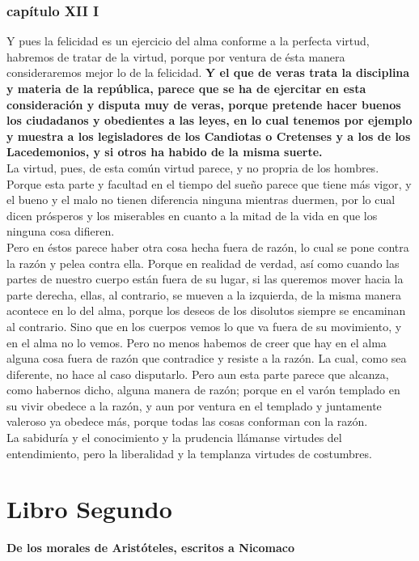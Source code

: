 \begin{multicols}{2}
\section*{capítulo XII I}
Y pues la felicidad es un ejercicio del alma conforme a la perfecta virtud, habremos de tratar de la virtud, porque por ventura de ésta manera consideraremos mejor lo de la felicidad. \textbf{Y el que de veras trata la disciplina y materia de la república, parece que se ha de ejercitar en esta consideración y disputa muy de veras, porque pretende hacer buenos los ciudadanos y obedientes a las leyes, en lo cual tenemos por ejemplo y muestra a los legisladores de los Candiotas o Cretenses y a los de los Lacedemonios, y si otros ha habido de la misma suerte.}\\
La virtud, pues, de esta común virtud parece, y no propria de los hombres. Porque esta parte y facultad en el tiempo del sueño parece que tiene más vigor, y el bueno y el malo no tienen diferencia ninguna mientras duermen, por lo cual dicen prósperos y los miserables en cuanto a la mitad de la vida en que los ninguna cosa difieren.\\
Pero en éstos parece haber otra cosa hecha fuera de razón, lo cual se pone contra la razón y pelea contra ella. Porque en realidad de verdad, así como cuando las partes de nuestro cuerpo están fuera de su lugar, si las queremos mover hacia la parte derecha, ellas, al contrario, se mueven a la izquierda, de la misma manera acontece en lo del alma, porque los deseos de los disolutos siempre se encaminan al contrario. Sino que en los cuerpos vemos lo que va fuera de su movimiento, y en el alma no lo vemos. Pero no menos habemos de creer que hay en el alma alguna cosa fuera de razón que contradice y resiste a la razón. La cual, como sea diferente, no hace al caso disputarlo. Pero aun esta parte parece que alcanza, como habernos dicho, alguna manera de razón; porque en el varón templado en su vivir obedece a la razón, y aun por ventura en el templado y juntamente valeroso ya obedece más, porque todas las cosas conforman con la razón.\\
La sabiduría y el conocimiento y la prudencia llámanse virtudes del entendimiento, pero la liberalidad y la templanza virtudes de costumbres.\\

\end{multicols}

\part*{Libro Segundo}
\textbf{\Large De los morales de Aristóteles, escritos a Nicomaco}

